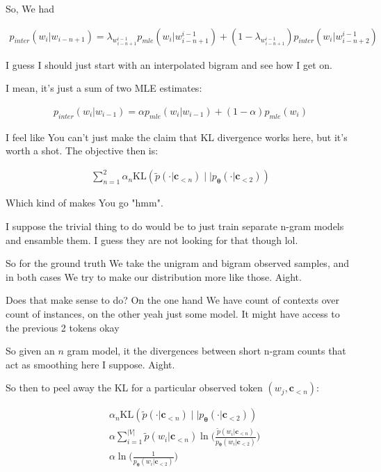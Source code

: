 \documentclass{article}
\newcommand{\KL}{\mathrm{KL}}
\newcommand{\vtheta}{\boldsymbol{\theta}}
\newcommand{\model}{p_{\vtheta}}
\newcommand{\context}{\boldsymbol{c}}
\begin{document}
			So, We had
			
			\begin{align}
				p_{inter}(w_i|w_{i-n+1}) = \lambda_{w^{i-1}_{i-n+1}} p_{mle}(w_i|w^{i-1}_{i-n+1}) + (1-\lambda_{w^{i-1}_{i-n+1}})p_{inter}(w_i|w^{i-1}_{i-n+2})
			\end{align}
		
			I guess I should just start with an interpolated bigram and see how I get on.
			
			I mean, it's just a sum of two MLE estimates:
			
			\begin{align}
				p_{inter}(w_i|w_{i-1}) = \alpha p_{mle}(w_i|w_{i-1}) + (1-\alpha)p_{mle}(w_i)
			\end{align}
		
			I feel like You can't just make the claim that KL divergence works here, but it's worth a shot. The objective then is:
			
			\begin{align}
				\sum^2_{n=1} \alpha_n \KL (\tilde{p}(\cdot | \context_{<n}) \mid\mid \model(\cdot | \context_{<2}))
			\end{align}
		
			Which kind of makes You go "hmm".
			
			I suppose the trivial thing to do would be to just train separate n-gram models and ensamble them. I guess they are not looking for that though lol.
			
			So for the ground truth We take the unigram and bigram observed samples, and in both cases We try to make our distribution more like those. Aight.
			
			Does that make sense to do? On the one hand We have count of contexts over count of instances, on the other yeah just some model. It might have access to the previous 2 tokens okay
			
			So given an $n$ gram model, it the divergences between short n-gram counts that act as smoothing here I suppose. Aight. 
			
			So then to peel away the KL for a particular observed token $(w_j, \context_{<n})$:
			
			\begin{align}
				& \alpha_n \KL (\tilde{p}(\cdot | \context_{<n}) \mid\mid \model(\cdot | \context_{<2}))\\
				& \alpha\sum^{|V|}_{i=1} \tilde{p}(w_i | \context_{<n})\ln\bigg( \frac{\tilde{p}(w_i | \context_{<n})}{\model(w_i | \context_{<2})} \bigg)\\
				& \alpha\ln\bigg( \frac{1}{\model(w_i | \context_{<2})} \bigg)
			\end{align}
			
\end{document}
